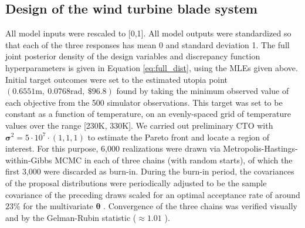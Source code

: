 \documentclass[twocolumn,10pt]{asme2ej}
\begin{document}
\subsection{Design of the wind turbine blade system}\label{the_model}
%
All model inputs were rescaled to [0,1]. 
%
All model outputs were standardized so that each of the three responses has mean 0 and standard deviation 1.
%
The full joint posterior density of the design variables and discrepancy function hyperparameters is given in Equation \eqref{eq:full_dist}, using the MLEs given above.
%
Initial target outcomes were set to the estimated utopia point $(0.6551\mathrm{m},\ 0.0768\mathrm{rad},\ \$96.8)$ found by taking the minimum observed value of each objective from the 500 simulator observations. 
%
This target was set to be constant as a function of temperature, on an evenly-spaced grid of temperature values over the range [230K, 330K].
%
We carried out preliminary CTO with $\boldsymbol\sigma^2=5\cdot10^7\cdot(1,1,1)$ to estimate the Pareto front and locate a region of interest. %
%
For this purpose, 6,000 realizations were drawn via Metropolis-Hastings-within-Gibbs MCMC \cite{Metropolis1953, Hastings1970, Geman1984} in each of three chains (with random starts), of which the first 3,000 were discarded as burn-in. 
%
During the burn-in period, the covariances of the proposal distributions were periodically adjusted to be the sample covariance of the preceding draws scaled for an optimal acceptance rate of around $23\%$ for the multivariate $\boldsymbol \theta$ \cite{Roberts1997,Gelman2013}. %
%
%
%
Convergence of the three chains was verified visually and by the Gelman-Rubin statistic ($\approx1.01$ \cite{Gelman1992a}).
%
\end{document}

